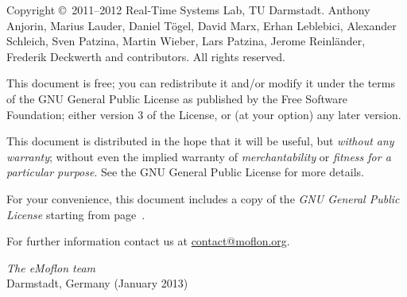 \documentclass[11pt,a4paper, twoside]{book}
\begin{document}
   
  
\frontmatter   

\maketitle

\begin{small} 
Copyright \copyright~2011--2012 Real-Time Systems Lab, TU Darmstadt.
Anthony Anjorin, Marius Lauder, Daniel T\"ogel, David Marx, Erhan Leblebici, Alexander Schleich, Sven Patzina, Martin Wieber, Lars Patzina, Jerome Reinl\"ander, Frederik Deckwerth and contributors.
All rights reserved.

This document is free; you can redistribute it and/or modify it under the terms of the GNU General Public License as published by the Free Software Foundation; either version 3 of the License, or (at your option) any later version.
 
This document is distributed in the hope that it will be useful, but \emph{without any warranty}; without even the implied warranty of \emph{merchantability} or \emph{fitness for a particular purpose}.
See the GNU General Public License for more details.
 
For your convenience, this document includes a copy of the \emph{GNU General Public License} starting from page~\pageref{chap:gpl}.
  
For further information contact us at \href{mailto:contact@moflon.org}{contact@moflon.org}.
  
\vskip3cm
\textit{The eMoflon team}\\
Darmstadt, Germany (January 2013)
\end{small}


\tableofcontents

\setcounter{romanpages}{\value{page}}

\mainmatter
 













\end{document}
